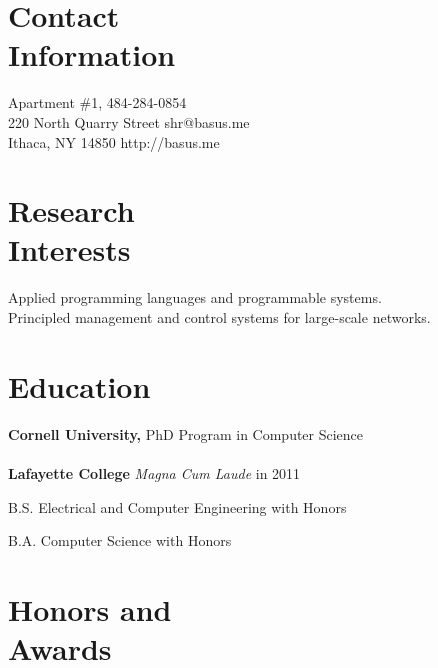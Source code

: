 \documentclass[margin,line]{resume}
\begin{document}

\begin{resume}


    \section{Contact\\Information}

    Apartment \#1,                          \hfill 484-284-0854          \\
    220 North Quarry Street                 \hfill shr@basus.me          \\
    Ithaca, NY 14850                        \hfill http://basus.me

    \section{Research\\Interests}

    Applied programming languages and programmable systems. \\
    Principled management and control systems for large-scale networks.

    \section{Education}

    {\bf Cornell University,} PhD Program in Computer Science \\
    \\
    {\bf Lafayette College} \emph{Magna Cum Laude} in 2011%
    \begin{list2}
        \item B.S. Electrical and Computer Engineering with Honors
        \item B.A. Computer Science with Honors
    \end{list2}
    \section{Honors and\\Awards}


\end{resume}
\end{document}
